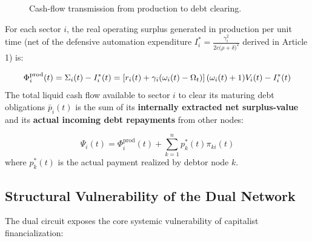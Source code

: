 \documentclass[11pt,letterpaper]{report}
\newcommand{\fitmath}[1]{\begingroup\setbox0=\hbox{$\displaystyle #1$}\ifdim\wd0>\linewidth\resizebox{\linewidth}{!}{$\displaystyle #1$}\else\displaystyle #1\fi\endgroup}
\begin{document}
\begin{figure}[H]\centering
{}
\caption{Cash-flow transmission from production to debt clearing.}
\end{figure}
For each sector $i$, the real operating surplus generated in production per unit time (net of the defensive automation expenditure ${I}_{i}^{*}=\frac{{\gamma }_{i}^{2}}{2c(\rho +\delta {)}^{2}}$ derived in Article 1) is:

\[\fitmath{{\Phi }_{i}^{\mathrm{prod}}(t)={\Sigma }_{i}(t)-{I}_{i}^{*}(t)=\left[{{r}_{i}(t)+{\gamma }_{i}({\omega }_{i}(t)-{\Omega }_{t})}\right]({\omega }_{i}(t)+1){V}_{i}(t)-{I}_{i}^{*}(t)}\]
The total liquid cash flow available to sector $i$ to clear its maturing debt obligations ${\bar{p}}_{i}(t)$ is the sum of its \textbf{internally extracted net surplus-value} and its \textbf{actual incoming debt repayments} from other nodes:

\[
{\Psi }_{i}(t)={\Phi }_{i}^{\mathrm{prod}}(t)+\sum\limits_{k=1}^{n}{p}_{k}^{*}(t){\pi }_{ki}(t)
\]
where ${p}_{k}^{*}(t)$ is the actual payment realized by debtor node $k$.

\subsection{Structural Vulnerability of the Dual Network}
The dual circuit exposes the core systemic vulnerability of capitalist financialization:
\end{document}
